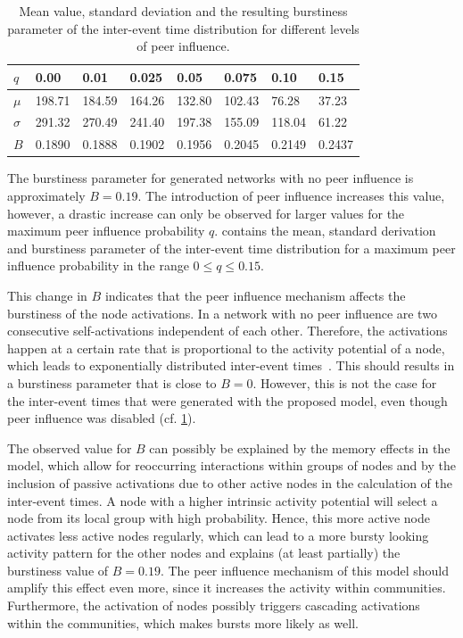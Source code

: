 \begin{table}
\centering
\begin{tabular}{llllllll}
\( q \) & 0.00 & 0.01 & 0.025 & 0.05 & 0.075 & 0.10 & 0.15 \\
\midrule
\( \mu \) & 198.71 & 184.59 & 164.26 & 132.80 & 102.43 & 76.28 & 37.23 \\
\midrule
\( \sigma \) & 291.32 & 270.49 & 241.40 & 197.38 & 155.09 & 118.04 & 61.22 \\
\midrule
\( B \) & 0.1890 & 0.1888 & 0.1902 & 0.1956 & 0.2045 & 0.2149 & 0.2437
\end{tabular}

\caption[Burstiness of inter-event time distributions]{Mean value, standard deviation and the resulting burstiness parameter of the inter-event time distribution for different levels of peer influence.}
\label{tbl:burstiness-parameter}
\end{table}


The burstiness parameter for generated networks with no peer influence is approximately \( B = 0.19 \).
The introduction of peer influence increases this value, however, a drastic increase can only be observed for larger values for the maximum peer influence probability \( q \).
 contains the mean, standard derivation and burstiness parameter of the inter-event time distribution for a maximum peer influence probability in the range \( 0 \leq q \leq 0.15 \).

This change in \( B \) indicates that the peer influence mechanism affects the burstiness of the node activations.
In a network with no peer influence are two consecutive self-activations independent of each other.
Therefore, the activations happen at a certain rate that is proportional to the activity potential of a node, which leads to exponentially distributed inter-event times~\cite{Moinet2016}.
This should results in a burstiness parameter that is close to \( B = 0 \).
However, this is not the case for the inter-event times that were generated with the proposed model, even though peer influence was disabled (cf. \cref{tbl:burstiness-parameter}).

The observed value for \( B \) can possibly be explained by the memory effects in the model, which allow for reoccurring interactions within groups of nodes and by the inclusion of passive activations due to other active nodes in the calculation of the inter-event times.
A node with a higher intrinsic activity potential will select a node from its local group with high probability.
Hence, this more active node activates less active nodes regularly, which can lead to a more bursty looking activity pattern for the other nodes and explains (at least partially) the burstiness value of \( B = 0.19 \).
The peer influence mechanism of this model should amplify this effect even more, since it increases the activity within communities.
Furthermore, the activation of nodes possibly triggers cascading activations within the communities, which makes bursts more likely as well.


